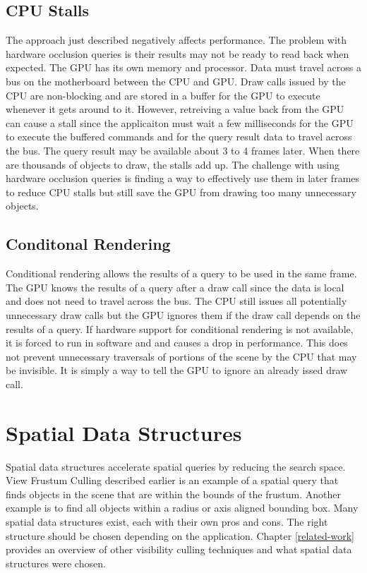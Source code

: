 \documentclass[12pt]{ucthesis}
\begin{document}
\subsection{CPU Stalls}
\label{cpu-stalls}

The approach just described negatively affects performance.
The problem with hardware occlusion queries is their results may not be ready to read back when expected.\cite{GpuGem-Occlusion, GpuGem-Queries, CHC, CHCpp}
The GPU has its own memory and processor.
Data must travel across a bus on the motherboard between the CPU and GPU.
Draw calls issued by the CPU are non-blocking and are stored in a buffer for the GPU to execute whenever it gets around to it.
However, retreiving a value back from the GPU can cause a stall since the applicaiton must wait a few milliseconds for the GPU to execute the buffered commands and for the query result data to travel across the bus.
The query result may be available about 3 to 4 frames later.
When there are thousands of objects to draw, the stalls add up.
The challenge with using hardware occlusion queries is finding a way to effectively use them in later frames to reduce CPU stalls but still save the GPU from drawing too many unnecessary objects.

\subsection{Conditonal Rendering}
\label{conditional-rendering}

Conditional rendering allows the results of a query to be used in the same frame.
The GPU knows the results of a query after a draw call since the data is local and does not need to travel across the bus.
The CPU still issues all potentially unnecessary draw calls but the GPU ignores them if the draw call depends on the results of a query.
If hardware support for conditional rendering is not available, it is forced to run in software and and causes a drop in performance.
This does not prevent unnecessary traversals of portions of the scene by the CPU that may be invisible.
It is simply a way to tell the GPU to ignore an already issed draw call.

\section{Spatial Data Structures}
\label{spatial-data-structures}

Spatial data structures accelerate spatial queries by reducing the search space.
View Frustum Culling described earlier is an example of a spatial query that finds objects in the scene that are within the bounds of the frustum.
Another example is to find all objects within a radius or axis aligned bounding box.
Many spatial data structures exist, each with their own pros and cons.
The right structure should be chosen depending on the application.
Chapter \ref{related-work} provides an overview of other visibility culling techniques and what spatial data structures were chosen.
\end{document}
